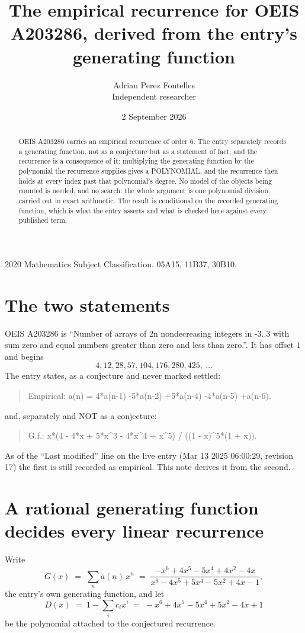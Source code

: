 \documentclass[11pt,a4paper]{article}
\title{The empirical recurrence for OEIS A203286, derived from the entry's generating function}
\author{Adrian Perez Fontelles\\ \small Independent researcher}
\date{2 September 2026}
\theoremstyle{plain}
\theoremstyle{definition}
\begin{document}
\maketitle

\begin{abstract}
OEIS A203286 carries an empirical recurrence of order $6$. The entry separately records a
generating function, not as a conjecture but as a statement of fact, and the recurrence is a
consequence of it: multiplying the generating function by the polynomial the recurrence
supplies gives a POLYNOMIAL, and the recurrence then holds at every index past that
polynomial's degree. No model of the objects being counted is needed, and no search: the
whole argument is one polynomial division, carried out in exact arithmetic. The result is
conditional on the recorded generating function, which is what the entry asserts and what is
checked here against every published term.
\end{abstract}

\noindent\small 2020 Mathematics Subject Classification. 05A15, 11B37, 30B10.\normalsize

\section{The two statements}

OEIS A203286 is ``Number of arrays of 2n nondecreasing integers in -3..3 with sum zero and equal numbers greater than zero and less than zero.''. It has offset $1$ and begins
\[
4, 12, 28, 57, 104, 176, 280, 425,\ \dots
\]
The entry states, as a conjecture and never marked settled:
\begin{quote}
Empirical: a(n) = 4*a(n-1) -5*a(n-2) +5*a(n-4) -4*a(n-5) +a(n-6).
\end{quote}
and, separately and NOT as a conjecture:
\begin{quote}
G.f.: x*(4 - 4*x + 5*x\^{}3 - 4*x\^{}4 + x\^{}5) / ((1 - x)\^{}5*(1 + x)).
\end{quote}
As of the ``Last modified'' line on the live entry (Mar 13 2025 06:00:29, revision 17) the first is still
recorded as empirical. This note derives it from the second.

\section{A rational generating function decides every linear recurrence}

Write
\[
G(x)\;=\;\sum_{n}a(n)\,x^{n}\;=\;\frac{- x^{6} + 4 x^{5} - 5 x^{4} + 4 x^{2} - 4 x}{x^{6} - 4 x^{5} + 5 x^{4} - 5 x^{2} + 4 x - 1},
\]
the entry's own generating function, and let
\[
D(x)\;=\;1-\sum_i c_i x^{i}\;=\;- x^{6} + 4 x^{5} - 5 x^{4} + 5 x^{2} - 4 x + 1
\]
be the polynomial attached to the conjectured recurrence.
\end{document}
